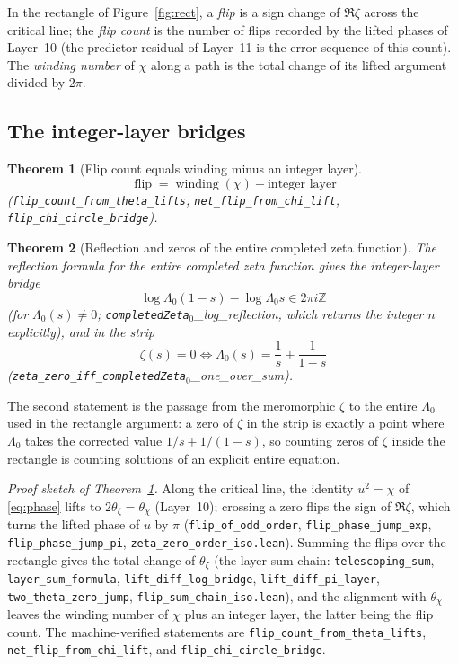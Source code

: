 \documentclass{article}
\newtheorem{theorem}{Theorem}[section]
\newcommand{\Z}{\mathbb{Z}}
\newcommand{\zt}{\zeta}
\newcommand{\Lam}{\Lambda}
\newcommand{\Xchi}{\chi}
\begin{document}
In the rectangle of Figure~\ref{fig:rect}, a \emph{flip} is a sign
change of $\Re\zt$ across the critical line; the
\emph{flip count} is the number of flips recorded by the lifted phases of
Layer~10 (the predictor residual of Layer~11 is the error sequence of this
count). The \emph{winding number} of $\Xchi$ along a path is the total
change of its lifted argument divided by $2\pi$.

\subsection{The integer-layer bridges}
\label{sec:bridge}

\begin{theorem}[Flip count equals winding minus an integer layer]
\label{thm:flipcount}
\[
\operatorname{flip}=\operatorname{winding}(\Xchi)-\text{integer layer}
\]
(\texttt{flip\_count\_from\_theta\_lifts},
\texttt{net\_flip\_from\_chi\_lift}, \texttt{flip\_chi\_circle\_bridge}).
\end{theorem}

\begin{theorem}[Reflection and zeros of the entire completed zeta function]
\label{thm:reflection}
The reflection formula for the entire completed zeta function gives the
integer-layer bridge
\[
\log\Lam_0(1-s)-\log\Lam_0 s\in 2\pi i\Z
\]
(for $\Lam_0(s)\neq 0$; \texttt{completedZeta}\(_0\)\_log\_reflection,
which returns the integer $n$ explicitly), and in the strip
\[
\zt(s)=0\iff\Lam_0(s)=\frac{1}{s}+\frac{1}{1-s}
\]
(\texttt{zeta\_zero\_iff\_completedZeta}\(_0\)\_one\_over\_sum).
\end{theorem}

The second statement is the passage from the meromorphic $\zt$ to the
entire $\Lam_0$ used in the rectangle argument: a zero of $\zt$ in the
strip is exactly a point where $\Lam_0$ takes the corrected value
$1/s+1/(1-s)$, so counting zeros of $\zt$ inside the rectangle is counting
solutions of an explicit entire equation.

\emph{Proof sketch of Theorem~\ref{thm:flipcount}.} Along the critical
line, the identity $u^2=\Xchi$ of \eqref{eq:phase} lifts to
$2\theta_{\zt}=\theta_{\Xchi}$ (Layer~10); crossing a zero flips the sign
of $\Re\zt$, which turns the lifted phase of $u$ by $\pi$
(\texttt{flip\_of\_odd\_order}, \texttt{flip\_phase\_jump\_exp},
\texttt{flip\_phase\_jump\_pi}, \texttt{zeta\_zero\_order\_iso.lean}).
Summing the
flips over the rectangle gives the total change of $\theta_{\zt}$ (the
layer-sum chain: \texttt{telescoping\_sum},
\texttt{layer\_sum\_formula}, \texttt{lift\_diff\_log\_bridge},
\texttt{lift\_diff\_pi\_layer}, \texttt{two\_theta\_zero\_jump},
\texttt{flip\_sum\_chain\_iso.lean}), and the
alignment with $\theta_{\Xchi}$ leaves the winding number of $\Xchi$ plus
an integer layer, the latter being the flip count. The machine-verified
statements are \texttt{flip\_count\_from\_theta\_lifts},
\texttt{net\_flip\_from\_chi\_lift}, and
\texttt{flip\_chi\_circle\_bridge}.
\end{document}
